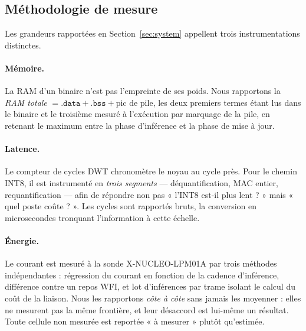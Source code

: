\subsection{Méthodologie de mesure}

Les grandeurs rapportées en Section~\ref{sec:system} appellent trois instrumentations distinctes.

\paragraph{Mémoire.} La RAM d'un binaire n'est pas l'empreinte de ses poids. Nous rapportons la
\emph{RAM totale} $= \texttt{.data} + \texttt{.bss} + \text{pic de pile}$, les deux premiers termes étant
lus dans le binaire et le troisième mesuré à l'exécution par marquage de la pile, en retenant le maximum
entre la phase d'inférence et la phase de mise à jour.

\paragraph{Latence.} Le compteur de cycles \gls{DWT} chronomètre le noyau au cycle près. Pour le chemin INT8, il
est instrumenté en \emph{trois segments} --- déquantification, \gls{MAC} entier, requantification --- afin de
répondre non pas « l'INT8 est-il plus lent ? » mais « quel poste coûte ? ». Les cycles sont rapportés
bruts, la conversion en microsecondes tronquant l'information à cette échelle.

\paragraph{Énergie.} Le courant est mesuré à la sonde X-NUCLEO-LPM01A par trois méthodes indépendantes :
régression du courant en fonction de la cadence d'inférence, différence contre un repos \gls{WFI}, et
lot d'inférences par trame isolant le calcul du coût de la liaison. Nous les rapportons \emph{côte à côte}
sans jamais les moyenner : elles ne mesurent pas la même frontière, et leur désaccord est lui-même un
résultat. Toute cellule non mesurée est reportée « à mesurer » plutôt qu'estimée.
